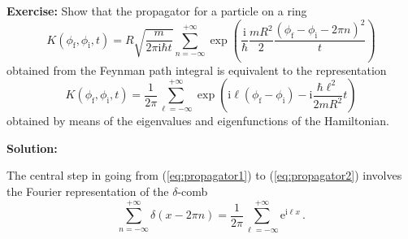 \documentclass[11pt,DIV=19,parskip=half]{scrartcl}
\begin{document}


\vspace{0.5truecm}
\textbf{Exercise:} Show that the propagator for a particle on a ring
\begin{equation}
 \label{eq:propagator1}
 K(\phi_\text{f}, \phi_\text{i}, t) = R\sqrt{\frac{m}{2\pi\text{i}\hbar t}}
    \sum_{n=-\infty}^{+\infty}\exp\!\left(\frac{\text{i}}{\hbar}\frac{mR^2}{2}
			      \frac{(\phi_\text{f}-\phi_\text{i}-2\pi n)^2}{t}\right)
\end{equation}
obtained from the Feynman path integral is equivalent to the representation
\begin{equation}
 \label{eq:propagator2}
 K(\phi_\text{f}, \phi_\text{i}, t) = \frac{1}{2\pi}\sum_{\ell=-\infty}^{+\infty}
	\exp\!\left(\text{i}\ell(\phi_\text{f}-\phi_\text{i})
               -\text{i}\frac{\hbar\ell^2}{2mR^2}t\right)
\end{equation}
obtained by means of the eigenvalues and eigenfunctions of the Hamiltonian.

\vspace{0.5truecm}
\textbf{Solution:}

The central step in going from (\ref{eq:propagator1}) to (\ref{eq:propagator2}) involves
the Fourier representation of the $\delta$-comb
\begin{equation}
 \label{eq:delta_comb}
 \sum_{n=-\infty}^{+\infty}\delta(x-2\pi n)
     = \frac{1}{2\pi}\sum_{\ell=-\infty}^{+\infty}\text{e}^{\text{i}\ell x}\,.
\end{equation}
\end{document}
